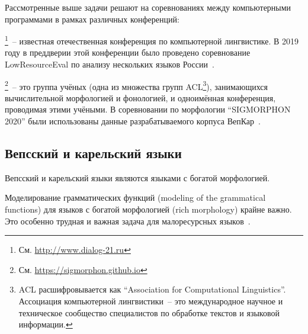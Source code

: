Рассмотренные выше задачи решают на соревнованиях 
между компьютерными программами в рамках различных конференций:
\begin{description}[align=left]
    \item [Диалог]\footnote{См. \url{http://www.dialog-21.ru}}~-- 
            известная отечественная конференция 
            по компьютерной лингвистике.
            В 2019 году в преддверии этой конференции 
            было проведено соревнование LowResourceEval 
            по анализу нескольких языков России~\cite{Klyachko2019LowresourceEval}.

\item [SIGMORPHON]\footnote{См. \url{https://sigmorphon.github.io}}~-- 
                это группа учёных (одна из множества групп ACL\footnote{%
                ACL расшифровывается как ``Association for Computational Linguistics''.
                Ассоциация компьютерной лингвистики~-- это 
                международное научное и техническое сообщество специалистов 
                по обработке текстов и языковой информации.
            }), 
            занимающихся вычислительной морфологией и фонологией, 
            и одноимённая конференция, проводимая этими учёными.
            В соревновании по морфологии ``SIGMORPHON 2020'' 
            были использованы данные 
            разрабатываемого корпуса ВепКар~\cite{Vylomova2020SIGMORPHON}.

\end{description}



\subsection{Вепсский и карельский языки}\label{sect_review_veps_karelian}

Вепсский и карельский языки являются языками с богатой морфологией. 

Моделирование грамматических функций (modeling of the grammatical functions) 
для языков с богатой морфологией (rich morphology) крайне важно. 
Это особенно трудная и важная задача 
для малоресурсных языков~\cite[2820]{Cruz-Anastasopoulos-Stump2020Chatino}.






